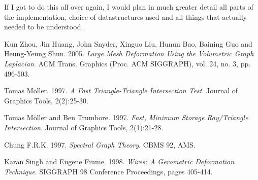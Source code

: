 \documentclass[10pt]{article}
\begin{document}
\begin{multicols}{2}
If I got to do this all over again, I would plan in much greater detail all parts of the implementation, choice of datastructures used and all things that actually needed to be understood.

\begin{thebibliography}{7}
Kun Zhou, Jin Huang, John Snyder, Xinguo Liu, Hunun Bao, Baining Guo and Heung-Yeung Shun. 2005.
\textit{Large Mesh Deformation Using the Volumetric Graph Laplacian}. 
ACM Trans. Graphics (Proc. ACM SIGGRAPH), vol. 24, no. 3, pp. 496-503.
 
Tomas M{\"o}ller. 1997.
\textit{A Fast Triangle-Triangle Intersection Test}.
Journal of Graphics Tools, 2(2):25-30.
 
Tomas M{\"o}ller and Ben Trumbore. 1997.
\textit{Fast, Minimum Storage Ray/Triangle Intersection}.
Journal of Graphics Tools, 2(1):21-28.

Chung F.R.K. 1997.
\textit{Spectral Graph Theory}.
CBMS 92, AMS.

Karan Singh and Eugene Fiume. 1998.
\textit{Wires: A Gerometric Deformation Technique}.
SIGGRAPH 98 Conference Proceedings, pages 405-414.
\end{thebibliography}



\end{multicols}
\end{document}
